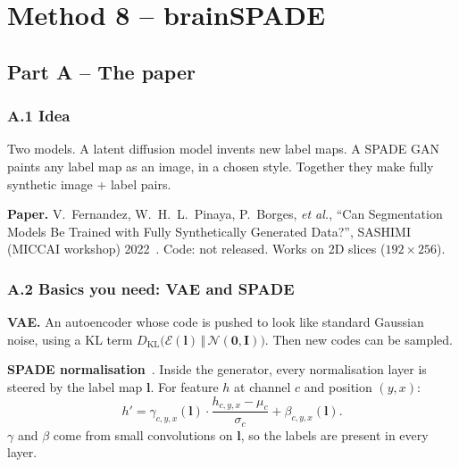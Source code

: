 \documentclass[11pt,a4paper,oneside]{report}
\newcommand{\N}{\mathcal{N}}
\newcommand{\enc}{\mathcal{E}}
\newcommand{\I}{\bm{I}}
\begin{document}
\chapter{Method 8 -- brainSPADE}\label{ch:spade}

\section{Part A -- The paper}

\subsection*{A.1 Idea}
\begin{idea}
Two models. A latent diffusion model invents new label maps. A SPADE GAN paints any label map as an image, in a chosen style. Together they make fully synthetic image + label pairs.
\end{idea}
\textbf{Paper.} V.~Fernandez, W.~H.~L.~Pinaya, P.~Borges, \emph{et al.}, ``Can Segmentation Models Be Trained with Fully Synthetically Generated Data?'', SASHIMI (MICCAI workshop) 2022~\cite{fernandez2022brainspade}. Code: not released. Works on 2D slices ($192\times256$).

\subsection*{A.2 Basics you need: VAE and SPADE}
\textbf{VAE.} An autoencoder whose code is pushed to look like standard Gaussian noise, using a KL term $D_{\text{KL}}\big(\enc(\bm l)\,\Vert\,\N(\bm 0,\I)\big)$. Then new codes can be sampled.

\textbf{SPADE normalisation}~\cite{park2019spade}. Inside the generator, every normalisation layer is steered by the label map $\bm l$. For feature $h$ at channel $c$ and position $(y,x)$:
\begin{equation}
h'=\gamma_{c,y,x}(\bm l)\cdot\frac{h_{c,y,x}-\mu_c}{\sigma_c}+\beta_{c,y,x}(\bm l).
\end{equation}
$\gamma$ and $\beta$ come from small convolutions on $\bm l$, so the labels are present in every layer.
\end{document}
